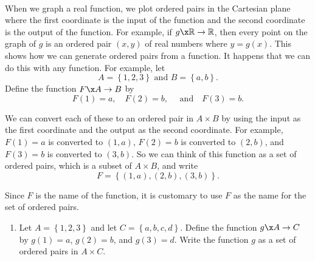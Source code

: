 \begin{previewactivity} \label{PA:functionasordered} \hfill \\
When we graph a real function, we plot ordered pairs in the Cartesian plane where the first coordinate is the input of the function and the second coordinate is the output of the function.  For example, if  $g\x \mathbb{R} \to \mathbb{R}$, then every point on the graph of  $g$  is an ordered pair  $( {x, y} )$ of real numbers where  $y = g( x )$.  This shows how we can generate ordered pairs from a function.  It happens that we can do this with any function.
For example, let  
\[
A = \left\{ {1, 2, 3} \right\} \text{ and } B = \left\{ {a, b} \right\}.
\]
Define the function  $F\x A \to B$ by  
\[
  F( 1 ) = a, \quad  
  F( 2 ) = b, \quad \text{ and} \quad 
  F( 3 ) = b. 
\]

We can convert each of these to an ordered pair in  $A \times B$ by using the input as the first coordinate and the output as the second coordinate.  For example, 
$F( 1 ) = a$ is converted to $( 1, a )$, 
$F( 2 ) = b$ is converted to $( 2, b )$, and 
$F( 3 ) = b$ is converted to $( 3, b )$.  So we can think of this function as a set of ordered pairs, which is a subset of  $A \times B$, and write
\[
F = \left\{ {( {1, a} ), ( {2, b} ), ( {3, b} )} \right\}\!.
\]

\noindent
\note  Since  $F$  is the name of the function, it is customary to use  $F$  as the name for the set of ordered pairs.

% 

\vskip10pt
\noindent
 \begin{enumerate}
\item Let  $A = \left\{ {1, 2, 3} \right\}$ and let  $C = \left\{ {a, b, c, d} \right\}$.  Define the function  $g\x A \to C$ by  $g( 1 ) = a$, $g( 2 ) = b$, and 
$g( 3 ) = d$.  Write the function  $g$  as a set of ordered pairs in  $A \times C$. 
\end{enumerate}


\end{previewactivity}
